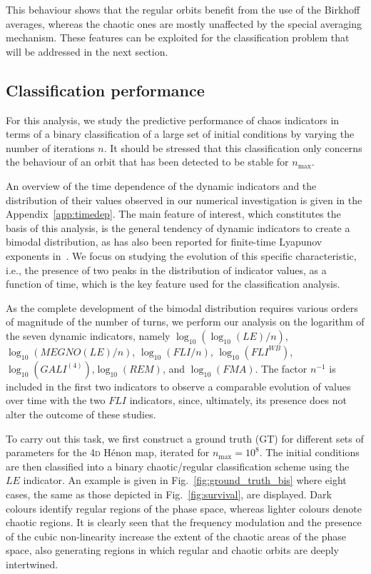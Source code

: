 This behaviour shows that the regular orbits benefit from the use of the Birkhoff averages, whereas the chaotic ones are mostly unaffected by the special averaging mechanism. These features can be exploited for the classification problem that will be addressed in the next section.

\subsection{Classification performance}\label{subsec:dyn:classification}

For this analysis, we study the predictive performance of chaos indicators in terms of a binary classification of a large set of initial conditions by varying the number of iterations $n$. It should be stressed that this classification only concerns the behaviour of an orbit that has been detected to be stable for $n_\mathrm{max}$.

An overview of the time dependence of the dynamic indicators and the distribution of their values observed in our numerical investigation is given in the Appendix~\ref{app:timedep}. The main feature of interest, which constitutes the basis of this analysis, is the general tendency of dynamic indicators to create a bimodal distribution, as has also been reported for finite-time Lyapunov exponents in~\cite{PhysRevE.60.2761,VALLEJO200326}. We focus on studying the evolution of this specific characteristic, i.e., the presence of two peaks in the distribution of indicator values, as a function of time, which is the key feature used for the classification analysis.

As the complete development of the bimodal distribution requires various orders of magnitude of the number of turns, we perform our analysis on the logarithm of the seven dynamic indicators, namely $\log_{10}(\log_{10}(LE)/n)$, $\log_{10}(MEGNO(LE)/n)$, $\log_{10}(FLI/n)$, $\log_{10}(FLI^{WB})$, $\log_{10}(GALI^{(4)})$,\linebreak$\log_{10}(REM)$, and $\log_{10}(FMA)$. The factor $n^{-1}$ is included in the first two indicators to observe a comparable evolution of values over time with the two $FLI$ indicators, since, ultimately, its presence does not alter the outcome of these studies.

To carry out this task, we first construct a ground truth (GT) for different sets of parameters for the 4\textsc{d} Hénon map, iterated for $n_\text{max} = 10^8$. The initial conditions are then classified into a binary chaotic/regular classification scheme using the $LE$ indicator. An example is given in Fig.~\ref{fig:ground_truth_bis} where eight cases, the same as those depicted in Fig.~\ref{fig:survival}, are displayed. Dark colours identify regular regions of the phase space, whereas lighter colours denote chaotic regions. It is clearly seen that the frequency modulation and the presence of the cubic non-linearity increase the extent of the chaotic areas of the phase space, also generating regions in which regular and chaotic orbits are deeply intertwined.  

